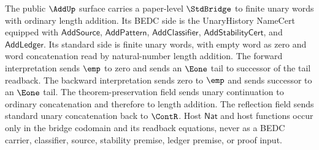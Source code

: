 \begin{theorem}
\label{thm:addup-acceptance-bridge-fields}
The public $\AddUp$ surface carries a paper-level $\StdBridge$ to finite unary
words with ordinary length addition. Its BEDC side is the UnaryHistory
NameCert equipped with $\mathsf{AddSource}$, $\mathsf{AddPattern}$,
$\mathsf{AddClassifier}$, $\mathsf{AddStabilityCert}$, and
$\mathsf{AddLedger}$. Its standard side is finite unary words, with empty word
as zero and word concatenation read by natural-number length addition. The
forward interpretation sends $\emp$ to zero and sends an $\Eone$ tail to
successor of the tail readback. The backward interpretation sends zero to
$\emp$ and sends successor to an $\Eone$ tail. The theorem-preservation field
sends unary continuation to ordinary concatenation and therefore to length
addition. The reflection field sends standard unary concatenation back to
$\ContR$. Host $\mathsf{Nat}$ and host functions occur only in the bridge
codomain and its readback equations, never as a BEDC carrier, classifier,
source, stability premise, ledger premise, or proof input.
\end{theorem}
